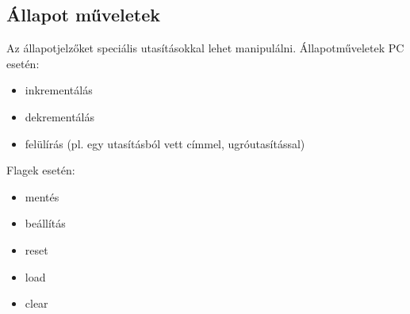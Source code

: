 \subsection{Állapot műveletek}
Az állapotjelzőket speciális utasításokkal lehet manipulálni.
Állapotműveletek PC esetén:
\begin{itemize}
    \item inkrementálás
    \item dekrementálás
    \item felülírás (pl. egy utasításból vett címmel, ugróutasítással)
\end{itemize}
Flagek esetén:
\begin{itemize}
    \item mentés
    \item beállítás
    \item reset
    \item load
    \item clear
\end{itemize}